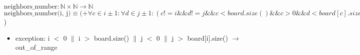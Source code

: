 \documentclass[12pt]{article}
\begin{document}
\noindent $\text{neighbors\_number} : \mathbb{N} \times \mathbb{N} \rightarrow \mathbb{N}$\\
\noindent $\text{neighbors\_number(i, j)} \equiv (+\forall c \in i \pm 1 : \forall d \in j \pm 1: (c != i \&\& d != j \&\& c < board.size() \&\& c > 0 \&\& d < board[c].size() \&\& d > 0): if(board[c][d]): 1  $)
\begin{itemize}
\item exception: i $<$ 0 $\|$ i $>$ board.size() $\|$ j $<$ 0 $\|$ j $>$ board[i].size() $\rightarrow$ out\_of\_range
\end{itemize}

\newpage
\end{document}
